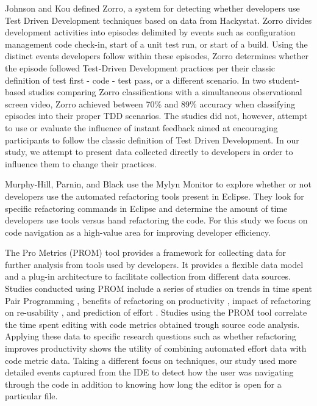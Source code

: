 \documentclass{sig-alternate}
\begin{document}
Johnson and Kou defined Zorro\cite{V:Johnson2007Automated}, a system for detecting whether developers use Test Driven Development techniques based on data from Hackystat.  Zorro divides development activities into episodes delimited by events such as configuration management code check-in, start of a unit test run, or start of a build.  Using the distinct events developers follow within these episodes, Zorro determines whether the episode followed Test-Driven Development practices per their classic definition of test first - code - test pass, or a different scenario.  In two student-based studies comparing Zorro classifications with a simultaneous observational screen video, Zorro achieved between 70\% \cite{Kou2010Operational} and 89\% \cite{V:Johnson2007Automated} accuracy when classifying episodes into their proper TDD scenarios.  The studies did not, however, attempt to use or evaluate the influence of instant feedback aimed at encouraging participants to follow the classic definition of Test Driven Development.  In our study, we attempt to present data collected directly to developers in order to influence them to change their practices.

Murphy-Hill, Parnin, and Black \cite{V:MurphyHill2012How} use the Mylyn Monitor to explore whether or not developers use the automated refactoring tools present in Eclipse.  They look for specific refactoring commands in Eclipse and determine the amount of time developers use tools versus hand refactoring the code.  For this study we focus on code navigation as a high-value area for improving developer efficiency.

The Pro Metrics (PROM) tool provides a framework for collecting data for further analysis from tools used by developers.\cite{Coman2009Casestudy}  It provides a flexible data model and a plug-in architecture to facilitate collection from different data sources.  Studies conducted using PROM include a series of studies on trends in time spent Pair Programming \cite{Coman2008Investigating}, benefits of refactoring on productivity \cite{Moser2008Case}, impact of refactoring on re-usability \cite{Moser2006Does}, and prediction of effort \cite{Abrahamsson2007Effort}.  Studies using the PROM tool correlate the time spent editing with code metrics obtained trough source code analysis.  Applying these data to specific research questions such as whether refactoring improves productivity \cite{Moser2008Case} shows the utility of combining automated effort data with code metric data.  Taking a different focus on techniques, our study used more detailed events captured from the IDE  to detect how the user was navigating through the code in addition to knowing how long the editor is open for a particular file.
\end{document}
